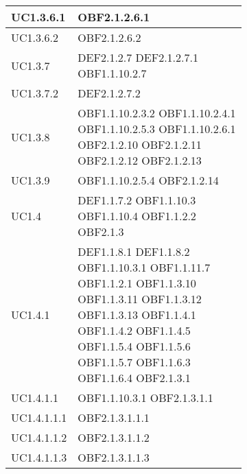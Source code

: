 \documentclass{scalatekids-article}
\begin{document}
\begin{longtable}[H]{|p{5.5cm}|p{5.5cm}|}
  \hline
  UC1.3.6.1 & \multiLineCell[t]{OBF2.1.2.6.1\\}\\
  \hline
  UC1.3.6.2 & \multiLineCell[t]{OBF2.1.2.6.2\\}\\
  \hline
  UC1.3.7 & \multiLineCell[t]{DEF2.1.2.7 DEF2.1.2.7.1\\OBF1.1.10.2.7\\}\\
  \hline
  UC1.3.7.2 & \multiLineCell[t]{DEF2.1.2.7.2\\}\\
  \hline
  UC1.3.8 & \multiLineCell[t]{OBF1.1.10.2.3.2 OBF1.1.10.2.4.1\\OBF1.1.10.2.5.3 OBF1.1.10.2.6.1\\OBF2.1.2.10 OBF2.1.2.11\\OBF2.1.2.12 OBF2.1.2.13\\}\\
  \hline
  UC1.3.9 & \multiLineCell[t]{OBF1.1.10.2.5.4 OBF2.1.2.14\\}\\
  \hline
  UC1.4 & \multiLineCell[t]{DEF1.1.7.2 OBF1.1.10.3\\OBF1.1.10.4 OBF1.1.2.2\\OBF2.1.3\\}\\
  \hline
  UC1.4.1 & \multiLineCell[t]{DEF1.1.8.1 DEF1.1.8.2\\OBF1.1.10.3.1 OBF1.1.11.7\\OBF1.1.2.1 OBF1.1.3.10\\OBF1.1.3.11 OBF1.1.3.12\\OBF1.1.3.13 OBF1.1.4.1\\OBF1.1.4.2 OBF1.1.4.5\\OBF1.1.5.4 OBF1.1.5.6\\OBF1.1.5.7 OBF1.1.6.3\\OBF1.1.6.4 OBF2.1.3.1\\}\\
  \hline
  UC1.4.1.1 & \multiLineCell[t]{OBF1.1.10.3.1 OBF2.1.3.1.1\\}\\
  \hline
  UC1.4.1.1.1 & \multiLineCell[t]{OBF2.1.3.1.1.1\\}\\
  \hline
  UC1.4.1.1.2 & \multiLineCell[t]{OBF2.1.3.1.1.2\\}\\
  \hline
  UC1.4.1.1.3 & \multiLineCell[t]{OBF2.1.3.1.1.3\\}\\

\end{longtable}
\end{document}
